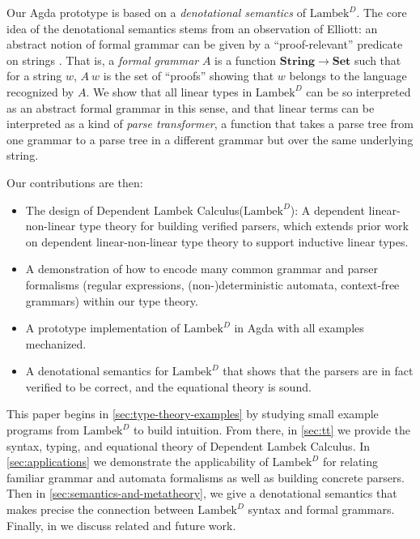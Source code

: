 \documentclass[acmsmall,nonacm]{acmart}
\newcommand{\StringSem}{\mathbf{String}}
\newcommand{\Set}{\mathbf{Set}}
\newcommand{\theoryname}{Dependent Lambek Calculus\xspace}
\newcommand{\theoryabbv}{$\textrm{Lambek}^D$\xspace}
\begin{document}
Our Agda prototype is based on a \emph{denotational semantics} of
\theoryabbv. The core idea of the denotational semantics stems from an observation of Elliott:
an abstract notion of formal grammar can be given by a ``proof-relevant'' predicate on strings \cite{elliottSymbolicAutomaticDifferentiation2021}. That is, a \emph{formal grammar} $A$ is a
function $\StringSem \to \Set$ such that for a string $w$, $A~w$ is the
set of ``proofs'' showing that $w$ belongs to the language recognized
by $A$. We show that all linear types in \theoryabbv can be so
interpreted as an abstract formal grammar in this sense, and that
linear terms can be interpreted as a kind of \emph{parse transformer}, a function that
takes a parse tree from one grammar to a parse tree in a different
grammar but over the same underlying string.

Our contributions are then:
%
\begin{itemize}
  \item The design of \theoryname (\theoryabbv): A dependent
    linear-non-linear type theory for building verified parsers, which
    extends prior work on dependent linear-non-linear type theory to
    support inductive linear types.
  \item A demonstration of how to encode many common grammar and parser formalisms
    (regular expressions, (non-)deterministic automata, context-free
    grammars) within our type theory.
  \item A prototype implementation of \theoryabbv in Agda with all
    examples mechanized.
  \item A denotational semantics for \theoryabbv that shows that the
    parsers are in fact verified to be correct, and the equational theory is sound.
\end{itemize}

This paper begins in \cref{sec:type-theory-examples} by studying small
example programs from \theoryabbv to build intuition.  From there, in
\cref{sec:tt} we provide the syntax, typing, and equational theory of
\theoryname. In \cref{sec:applications} we demonstrate the
applicability of \theoryabbv for relating familiar grammar and
automata formalisms as well as building concrete parsers.  Then in
\cref{sec:semantics-and-metatheory}, we give a denotational semantics
that makes precise the connection between \theoryabbv syntax and
formal grammars. Finally, in  we discuss related
and future work.

\ifarxiv{}\fi
\end{document}
